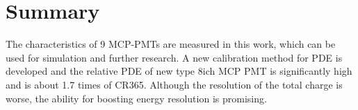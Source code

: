 \section{Summary}
\label{Summary}
The characteristics of 9 MCP-PMTs are measured in this work, which can be used for simulation and further research. A new calibration method for PDE is developed and the relative PDE of new type 8ich MCP PMT is significantly high and is about 1.7 times of CR365. Although the resolution of the total charge is worse, the ability for boosting energy resolution is promising.